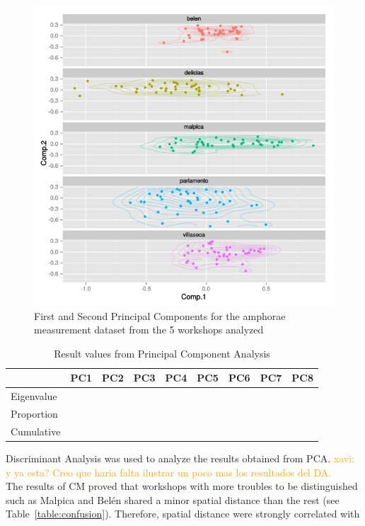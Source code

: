 \documentclass[review]{elsarticle}
\newcommand{\memo}[2]{\textcolor{#1}{#2}}
\newcommand{\xavi}[1]{\memo{orange}{xavi: #1\\}}
\begin{document}
\begin{figure}[htp]
	\centering
\includegraphics[scale=0.45]{pca.png}
\caption{First and Second Principal Components for the amphorae measurement dataset from the 5 workshops analyzed }
\label{pca}
\end{figure} 


\begin{table}[htp]
\begin{tabular}{lcccccccc}
\hline
      		&  PC1 & PC2	& PC3 & PC4 & PC5 & PC6 & PC7 & PC8     \\ \hline
Eigenvalue  	& 	   &		&	  &  	&	  &	    &     &           \\
Proportion  & 	   &		&	  &   	&	  &	    &     &           \\
Cumulative  &       &    &     &     &     &     &     &           \\

\end{tabular}
\caption{Result values from Principal Component Analysis}
\label{table:spatgeo}
\end{table}

Discriminant Analysis was used to analyze the results obtained from PCA. \xavi{y ya esta? Creo que haria falta ilustrar un poco mas los resultados del DA.} The results of CM proved that workshops with more troubles to be distinguished such as Malpica and Bel\'en shared a minor spatial distance than the rest (see Table~\ref{table:confusion}). Therefore, spatial distance were strongly correlated with 
\end{document}
